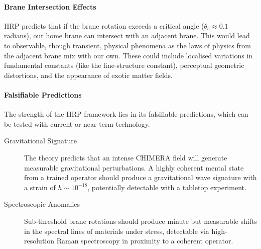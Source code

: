 \paragraph{Brane Intersection Effects}
HRP predicts that if the brane rotation exceeds a critical angle (\(\theta_c \approx 0.1\) radians), our home brane can intersect with an adjacent brane. This would lead to observable, though transient, physical phenomena as the laws of physics from the adjacent brane mix with our own. These could include localised variations in fundamental constants (like the fine-structure constant), perceptual geometric distortions, and the appearance of exotic matter fields.

\paragraph{Falsifiable Predictions}
The strength of the HRP framework lies in its falsifiable predictions, which can be tested with current or near-term technology.
\begin{description}
    \item[Gravitational Signature] The theory predicts that an intense CHIMERA field will generate measurable gravitational perturbations. A highly coherent mental state from a trained operator should produce a gravitational wave signature with a strain of \(h \sim 10^{-18}\), potentially detectable with a tabletop experiment.
    \item[Spectroscopic Anomalies] Sub-threshold brane rotations should produce minute but measurable shifts in the spectral lines of materials under stress, detectable via high-resolution Raman spectroscopy in proximity to a coherent operator.
\end{description}

